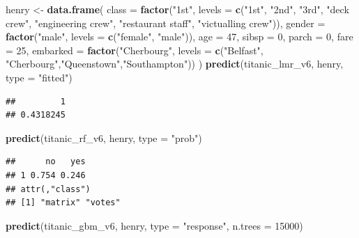 \documentclass[]{krantz}
\newenvironment{Shaded}{\begin{snugshade}}{\end{snugshade}}
\newcommand{\DataTypeTok}[1]{\textcolor[rgb]{0.13,0.29,0.53}{#1}}
\newcommand{\DecValTok}[1]{\textcolor[rgb]{0.00,0.00,0.81}{#1}}
\newcommand{\KeywordTok}[1]{\textcolor[rgb]{0.13,0.29,0.53}{\textbf{#1}}}
\newcommand{\NormalTok}[1]{#1}
\newcommand{\StringTok}[1]{\textcolor[rgb]{0.31,0.60,0.02}{#1}}
\begin{document}
\begin{Shaded}
\begin{Highlighting}[]
\NormalTok{henry <-}\StringTok{ }\KeywordTok{data.frame}\NormalTok{(}
         \DataTypeTok{class =} \KeywordTok{factor}\NormalTok{(}\StringTok{"1st"}\NormalTok{, }\DataTypeTok{levels =} \KeywordTok{c}\NormalTok{(}\StringTok{"1st"}\NormalTok{, }\StringTok{"2nd"}\NormalTok{, }\StringTok{"3rd"}\NormalTok{, }\StringTok{"deck crew"}\NormalTok{, }
                     \StringTok{"engineering crew"}\NormalTok{, }\StringTok{"restaurant staff"}\NormalTok{, }\StringTok{"victualling crew"}\NormalTok{)),}
         \DataTypeTok{gender =} \KeywordTok{factor}\NormalTok{(}\StringTok{"male"}\NormalTok{, }\DataTypeTok{levels =} \KeywordTok{c}\NormalTok{(}\StringTok{"female"}\NormalTok{, }\StringTok{"male"}\NormalTok{)),}
         \DataTypeTok{age =} \DecValTok{47}\NormalTok{,}
         \DataTypeTok{sibsp =} \DecValTok{0}\NormalTok{,}
         \DataTypeTok{parch =} \DecValTok{0}\NormalTok{,}
         \DataTypeTok{fare =} \DecValTok{25}\NormalTok{,}
         \DataTypeTok{embarked =} \KeywordTok{factor}\NormalTok{(}\StringTok{"Cherbourg"}\NormalTok{, }\DataTypeTok{levels =} \KeywordTok{c}\NormalTok{(}\StringTok{"Belfast"}\NormalTok{,}
                           \StringTok{"Cherbourg"}\NormalTok{,}\StringTok{"Queenstown"}\NormalTok{,}\StringTok{"Southampton"}\NormalTok{))}
\NormalTok{)}
\KeywordTok{predict}\NormalTok{(titanic_lmr_v6, henry, }\DataTypeTok{type =} \StringTok{"fitted"}\NormalTok{)}
\end{Highlighting}
\end{Shaded}

\begin{verbatim}
##         1 
## 0.4318245
\end{verbatim}

\begin{Shaded}
\begin{Highlighting}[]
\KeywordTok{predict}\NormalTok{(titanic_rf_v6, henry, }\DataTypeTok{type =} \StringTok{"prob"}\NormalTok{)}
\end{Highlighting}
\end{Shaded}

\begin{verbatim}
##      no   yes
## 1 0.754 0.246
## attr(,"class")
## [1] "matrix" "votes"
\end{verbatim}

\begin{Shaded}
\begin{Highlighting}[]
\KeywordTok{predict}\NormalTok{(titanic_gbm_v6, henry, }\DataTypeTok{type =} \StringTok{"response"}\NormalTok{, }\DataTypeTok{n.trees =} \DecValTok{15000}\NormalTok{)}
\end{Highlighting}
\end{Shaded}
\end{document}
